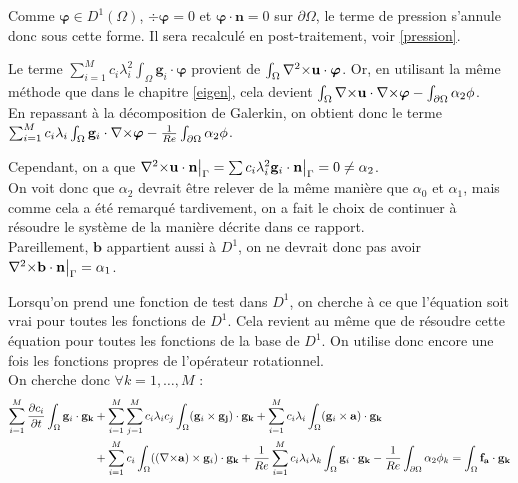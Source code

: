 \begin{rk}
Comme $\bm{\varphi}\in D^1(\Omega)$, $\div\bm{\varphi}=0$ et $\bm{\varphi}\cdot \mathbf{n}=0$ sur $\partial\Omega$, le terme de pression s'annule donc sous cette forme. Il sera recalculé en post-traitement, voir \ref{pression}.\\
\end{rk}
Le terme $\sum_{i=1}^Mc_i\lambda_i^2\int_\Omega\mathbf{g}_i\cdot\bm{\varphi}$ provient de $\int_\Omega {\nabla^2\times}\mathbf{u}\cdot\bm{\varphi}$. Or, en utilisant la même méthode que dans le chapitre \ref{eigen}, cela devient $\int_\Omega{\nabla\times}\mathbf{u}\cdot{\nabla\times}\bm{\varphi} -\int_{\partial\Omega} \alpha_2\phi$.\\
En repassant à la décomposition de Galerkin, on obtient donc le terme $\sum_{i=1}^Mc_i\lambda_i\int_\Omega\mathbf{g}_i\cdot{\nabla\times}\bm{\varphi}-\frac{1}{Re}\int_{\partial\Omega} \alpha_2\phi$.\\
\begin{rk}
Cependant, on a que ${\nabla^2\times}\mathbf{u}\cdot\mathbf{n}{\big\rvert_{\Gamma}}=\sum c_i\lambda_i^2 \mathbf{g}_i\cdot\mathbf{n}{\big\rvert_{\Gamma}} = 0 \neq\alpha_2$.\\
On voit donc que $\alpha_2$ devrait être relever de la même manière que $\alpha_0$ et $\alpha_1$, mais comme cela a été remarqué tardivement, on a fait le choix de continuer à résoudre le système de la manière décrite dans ce rapport.\\
Pareillement, $\mathbf{b}$ appartient aussi à $D^1$, on ne devrait donc pas avoir ${\nabla^2\times}\mathbf{b}\cdot\mathbf{n}{\big\rvert_{\Gamma}}=\alpha_1$.
\end{rk}
Lorsqu'on prend une fonction de test dans $D^1$, on cherche à ce que l'équation soit vrai pour toutes les fonctions de $D^1$. Cela revient au même que de résoudre cette équation pour toutes les fonctions de la base de $D^1$. On utilise donc encore une fois les fonctions propres de l'opérateur rotationnel.\\
On cherche donc $\forall k=1,\dots,M$ :
\begin{align*}
\sum_{i=1}^M\frac{\partial c_i}{\partial t}\int_\Omega\mathbf{g}_i\cdot\mathbf{g_k} &+ \sum_{i=1}^M\sum_{j=1}^Mc_i\lambda_ic_j\int_\Omega(\mathbf{g}_i\times \mathbf{g_j})\cdot\mathbf{g_k} + \sum_{i=1}^Mc_i\lambda_i\int_\Omega(\mathbf{g}_i\times \mathbf{a})\cdot\mathbf{g_k}\\
& +  \sum_{i=1}^Mc_i\int_\Omega(({\nabla\times}\mathbf{a})\times \mathbf{g}_i)\cdot\mathbf{g_k} +\frac{1}{Re}\sum_{i=1}^Mc_i\lambda_i\lambda_k\int_\Omega\mathbf{g}_i\cdot\mathbf{g_k}-\frac{1}{Re}\int_{\partial\Omega} \alpha_2\phi_k = \int_\Omega\mathbf{f_a}\cdot\mathbf{g_k}\\
\end{align*}

